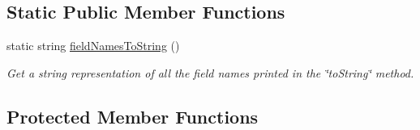 \subsection*{Static Public Member Functions}
\begin{DoxyCompactItemize}
\item 
static string \hyperlink{classmultiscale_1_1analysis_1_1SpatialEntityPseudo3D_a3c24e3f06c999002f18e1ddd8be3f927}{field\-Names\-To\-String} ()
\begin{DoxyCompactList}\small\item\em Get a string representation of all the field names printed in the \char`\"{}to\-String\char`\"{} method. \end{DoxyCompactList}\end{DoxyCompactItemize}
\subsection*{Protected Member Functions}
